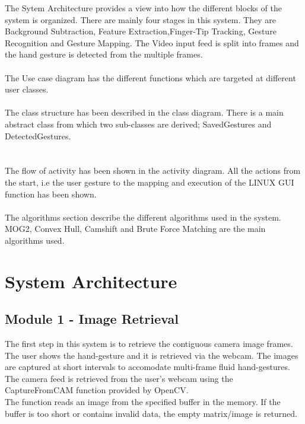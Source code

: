 \documentclass{scrreprt}
\begin{document}
The Sytem Architecture provides a view into how the different blocks of the system is organized.
There are mainly four stages in this system. They are Background Subtraction, Feature Extraction,Finger-Tip Tracking, Gesture Recognition and Gesture Mapping.
The Video input feed is split into frames and the hand gesture is detected from the multiple frames.
\\
\\
The Use case diagram has the different functions which are targeted at different user classes.
\\
\\
The class structure has been described in the class diagram. There is a main abstract class from which two 
sub-classes are derived; SavedGestures and DetectedGestures. \\
\\
\\
The flow of activity has been shown in the activity diagram. All the actions from the start, i.e the user gesture to the mapping and execution of the LINUX GUI function has been shown.
\\
\\
The algorithms section describe the different algorithms used in the system.
MOG2, Convex Hull, Camshift and Brute Force Matching are the main algorithms used.
  


\chapter{System Architecture}

\section{Module 1 - Image Retrieval}
The first step in this system is to retrieve the contiguous camera image frames. The user shows the hand-gesture 
and it is retrieved via the webcam. The images are captured at short intervals to accomodate multi-frame fluid hand-gestures.
\\
The camera feed is retrieved from the user's webcam using the CaptureFromCAM function provided by OpenCV.
\\
The function reads an image from the specified buffer in the memory. If the buffer is too short or contains invalid data, the empty matrix/image is returned.
\end{document}
